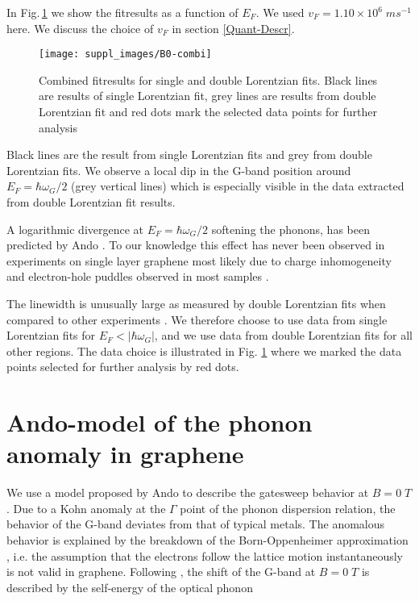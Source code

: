 \documentclass[pra,aps,superscriptaddress,preprint]{revtex4-1}
\begin{document}
\noindent
In Fig.\,\ref{b0-combi} we show the fitresults as a function of $E_F$. We used $v_F = 1.10 \times 10^6 \; ms^{-1}$ here. We discuss the choice of $v_F$ in section \ref{Quant-Descr}.
\noindent
\begin{figure}
   \texttt{[image: suppl\_images/B0-combi]}
   \caption{\label{b0-combi}Combined fitresults for single and double Lorentzian fits. Black lines are results of single Lorentzian fit, grey lines are results from double Lorentzian fit and red dots mark the selected data points for further analysis }
\end{figure}
\noindent
Black lines are the result from single Lorentzian fits and grey from double Lorentzian fits. We observe a local dip in the G-band position around $E_F=\hbar\omega_G/2$ (grey vertical lines) which is especially visible in the data extracted from double Lorentzian fit results.

A logarithmic divergence at $E_F=\hbar\omega_G/2$ softening the phonons, has been predicted by Ando \cite{tsuneya2006anomaly}. 
To our knowledge this effect has never been observed in experiments on single layer graphene most likely due to charge inhomogeneity and electron-hole puddles observed in most samples \cite{yan2007electric,martin2007observation}. 

The linewidth is unusually large as measured by double Lorentzian fits when compared to other experiments \citep{yan2007electric}. We therefore choose to use data from single Lorentzian fits for $E_F<\left|\hbar\omega_G\right|$, and we use data from double Lorentzian fits for all other regions. The data choice is illustrated in Fig. \ref{b0-combi} where we marked the data points selected for further analysis by red dots. 

\newpage
\section{Ando-model of the phonon anomaly in graphene}

We use a model proposed by Ando \cite{tsuneya2006anomaly} to describe the gatesweep behavior at $B=0\; T$. Due to a Kohn anomaly at the $\Gamma$ point of the phonon dispersion relation, the behavior of the G-band deviates from that of typical metals. The anomalous behavior is explained by the breakdown of the Born-Oppenheimer approximation \cite{pisana2007breakdown}, i.e. the assumption that the electrons follow the lattice motion instantaneously is not valid in graphene. Following \cite{tsuneya2006anomaly}, the shift of the G-band at $B=0\; T$ is described by the self-energy of the optical phonon
\end{document}
